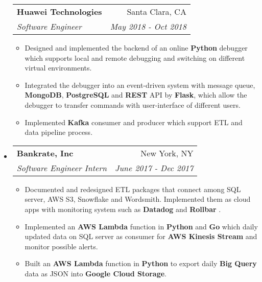 \documentclass[letterpaper,9pt]{article}
\makeatletter
\newcommand{\resitem}[1]{\item #1 \vspace{-2pt}}
\newcommand{\ressubheading}[4]{
\begin{tabular*}{7.1in}{l@{\cftdotfill{\cftsecdotsep}\extracolsep{\fill}}r}
		\textbf{#1} & #2 \\
		\textit{#3} & \textit{#4} \\
\end{tabular*}\vspace{-6pt}}
\makeatother
\begin{document}
\begin{itemize}
	\ressubheading{Huawei Technologies}{Santa Clara, CA}{Software Engineer}{May 2018 - Oct 2018}
	\begin{itemize}
            \resitem{Designed and implemented the backend of an online  \textbf{Python} debugger which supports local and remote debugging and switching on different virtual environments.}
            \resitem{Integrated the debugger into an event-driven system with message queue, \textbf{MongoDB}, \textbf{PostgreSQL} and  \textbf{REST} API by \textbf{Flask}, which allow the debugger to transfer commands with user-interface of different users.}
            \resitem{Implemented \textbf{Kafka} consumer and producer which support ETL and data pipeline process.}
	\end{itemize}





\item
	\ressubheading{Bankrate, Inc}{New York, NY}{Software Engineer Intern}{June 2017 - Dec 2017}
	\begin{itemize}
			\resitem{Documented and redesigned ETL packages that connect among SQL server, AWS S3, Snowflake and Wordsmith. Implemented them as cloud apps with monitoring system such as\textbf{ Datadog} and \textbf{Rollbar}}.
\iffalse

			\resitem{Implemented data filters and cleaners in  \textbf{Python} to transform data and pipeline to \textbf{Snowflake} by \textbf{Alooma}. }
\fi
			
\iffalse
			\resitem{Magnaged \textbf{Github} repositories of Data Engineering team. Migrated \textbf{SQL} codes and \textbf{SSIS} packages using Git.}
\fi
\resitem{Implemented an \textbf{AWS Lambda} function in \textbf{Python} and \textbf{Go} which daily updated data on SQL server as consumer for \textbf{AWS Kinesis Stream} and monitor possible alerts.}

\resitem{Built an \textbf{AWS Lambda} function in \textbf{Python} to export daily \textbf{Big Query} data as JSON into \textbf{Google Cloud Storage}.}


	\end{itemize}









\end{itemize}
\end{document}
